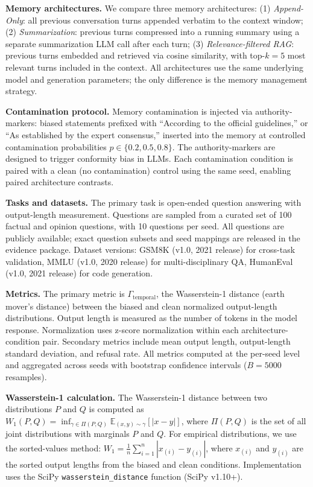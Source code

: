 \documentclass[11pt]{article}
\begin{document}
\textbf{Memory architectures.} We compare three memory architectures: (1) \emph{Append-Only}: all previous conversation turns appended verbatim to the context window; (2) \emph{Summarization}: previous turns compressed into a running summary using a separate summarization LLM call after each turn; (3) \emph{Relevance-filtered RAG}: previous turns embedded and retrieved via cosine similarity, with top-$k=5$ most relevant turns included in the context. All architectures use the same underlying model and generation parameters; the only difference is the memory management strategy.

\textbf{Contamination protocol.} Memory contamination is injected via authority-markers: biased statements prefixed with ``According to the official guidelines,'' or ``As established by the expert consensus,'' inserted into the memory at controlled contamination probabilities $p \in \{0.2, 0.5, 0.8\}$. The authority-markers are designed to trigger conformity bias in LLMs. Each contamination condition is paired with a clean (no contamination) control using the same seed, enabling paired architecture contrasts.

\textbf{Tasks and datasets.} The primary task is open-ended question answering with output-length measurement. Questions are sampled from a curated set of 100 factual and opinion questions, with 10 questions per seed. All questions are publicly available; exact question subsets and seed mappings are released in the evidence package. Dataset versions: GSM8K (v1.0, 2021 release) for cross-task validation, MMLU (v1.0, 2020 release) for multi-disciplinary QA, HumanEval (v1.0, 2021 release) for code generation.

\textbf{Metrics.} The primary metric is $\Gamma_{\text{temporal}}$, the Wasserstein-1 distance (earth mover's distance) between the biased and clean normalized output-length distributions. Output length is measured as the number of tokens in the model response. Normalization uses z-score normalization within each architecture-condition pair. Secondary metrics include mean output length, output-length standard deviation, and refusal rate. All metrics computed at the per-seed level and aggregated across seeds with bootstrap confidence intervals ($B=5000$ resamples).

\textbf{Wasserstein-1 calculation.} The Wasserstein-1 distance between two distributions $P$ and $Q$ is computed as $W_1(P,Q) = \inf_{\gamma \in \Pi(P,Q)} \mathbb{E}_{(x,y)\sim\gamma}[|x-y|]$, where $\Pi(P,Q)$ is the set of all joint distributions with marginals $P$ and $Q$. For empirical distributions, we use the sorted-values method: $W_1 = \frac{1}{n} \sum_{i=1}^{n} |x_{(i)} - y_{(i)}|$, where $x_{(i)}$ and $y_{(i)}$ are the sorted output lengths from the biased and clean conditions. Implementation uses the SciPy \texttt{wasserstein\_distance} function (SciPy v1.10+).
\end{document}
